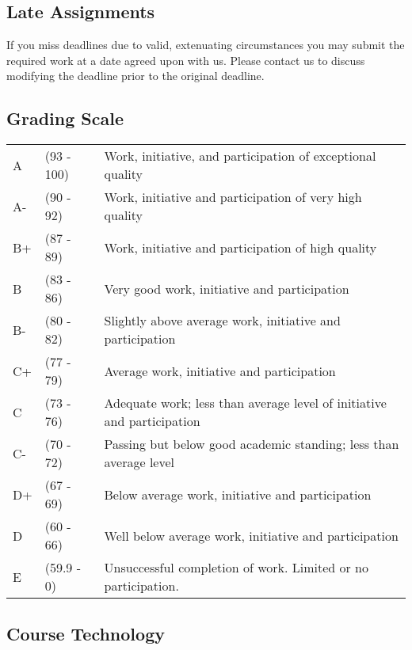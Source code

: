 \subsection{Late Assignments}

If you miss deadlines due to valid, extenuating circumstances you may submit the required work at a date agreed upon with us. Please contact us to discuss modifying the deadline prior to the original deadline.

\subsection{Grading Scale}

\begin{tabularx}{\textwidth}{@{}l @{}l X@{}}
      A \hspace*{1em} & (93 - 100) & Work, initiative, and participation of exceptional quality             \\
      A-              & (90 - 92)  & Work, initiative and participation of very high quality                \\
      B+              & (87 - 89)  & Work, initiative and participation of high quality                     \\
      B               & (83 - 86)  & Very good work, initiative and participation                           \\
      B-              & (80 - 82)  & Slightly above average work, initiative and participation              \\
      C+              & (77 - 79)  & Average work, initiative and participation                             \\
      C               & (73 - 76)  & Adequate work; less than average level of initiative and participation \\
      C-              & (70 - 72)  & Passing but below good academic standing; less than average level      \\
      D+              & (67 - 69)  & Below average work, initiative and participation                       \\
      D               & (60 - 66)  & Well below average work, initiative and participation                  \\
      E               & (59.9 - 0) & Unsuccessful completion of work. Limited or no participation.
\end{tabularx}


\subsection{Course Technology}


